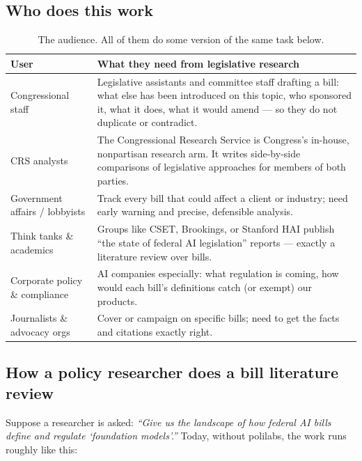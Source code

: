 \documentclass[11pt]{article}
\begin{document}
\subsection{Who does this work}

\begin{table}[ht]
\centering\small
\begin{tabular}{@{}lp{9.0cm}@{}}
\toprule
\textbf{User} & \textbf{What they need from legislative research}\\
\midrule
Congressional staff & Legislative assistants and committee staff drafting a
  bill: what else has been introduced on this topic, who sponsored it, what it
  does, what it would amend --- so they do not duplicate or contradict.\\
CRS analysts & The Congressional Research Service is Congress's in-house,
  nonpartisan research arm. It writes side-by-side comparisons of legislative
  approaches for members of both parties.\\
Government affairs / lobbyists & Track every bill that could affect a client or
  industry; need early warning and precise, defensible analysis.\\
Think tanks \& academics & Groups like CSET, Brookings, or Stanford HAI publish
  ``the state of federal AI legislation'' reports --- exactly a literature
  review over bills.\\
Corporate policy \& compliance & AI companies especially: what regulation is
  coming, how would each bill's definitions catch (or exempt) our products.\\
Journalists \& advocacy orgs & Cover or campaign on specific bills; need to get
  the facts and citations exactly right.\\
\bottomrule
\end{tabular}
\caption{The audience. All of them do some version of the same task below.}
\end{table}

\subsection{How a policy researcher does a bill literature review}

Suppose a researcher is asked: \emph{``Give us the landscape of how federal AI
bills define and regulate `foundation models'.''} Today, without polilabs, the
work runs roughly like this:
\end{document}
